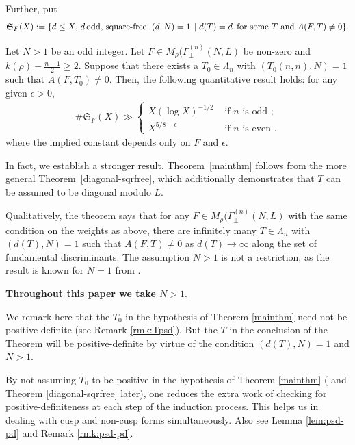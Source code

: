 \documentclass[11pt]{amsart}
\numberwithin{equation}{section}
\newcommand{\mk}{\mathfrak}
\newcommand{\Mrho}[2]{M_\rho(\Gamma_\pm^{(#1)}(#2, L)}
\begin{document}
Further, put
\begin{align} \label{sfx}
{\mk S}_F (X) := \{ d \leq X, \,  d \, \mbox{\rm{odd, square-free}}, \, (d,N)=1 \, \mid  d(T)=d \, \mbox{\rm{ for some }} T \mbox{\rm{ and }}  A(F,T) \neq 0 \}.  
\end{align}




\begin{theorem}\label{mainthm}
Let $N>1$ be an odd integer. Let $F \in \Mrho{n}{N}$ be non-zero and $k(\rho) - \frac{n-1}{2} \ge 2 $. Suppose that there exists a $T_0\in \Lambda_n$ with $(T_0(n,n), N)=1$ such that $A(F,T_0)\neq 0$. Then, the following  quantitative result holds: for any given $\epsilon>0$,
\begin{align*}
\# {\mk S}_F (X)  \gg\begin{cases} X(\log X)^{-1/2} &\text{ if } n \text{ is odd };  \\ 
X^{5/8 - \epsilon} &\text{ if } n \text{ is even }.
\end{cases}
\end{align*}
where the implied constant depends only on $F$ and $\epsilon$.
\end{theorem}

In fact, we establish a stronger result. Theorem~\ref{mainthm} follows from the more general Theorem~\ref{diagonal-sqrfree}, which additionally demonstrates that $T$ can be assumed to be diagonal modulo $L$.

Qualitatively, the theorem says that for any $F \in \Mrho{n}{N}$ with the same condition on the weights as above, there are infinitely many $T\in \Lambda_n$ with $(d(T), N)=1$ such that $A(F,T)\neq 0$ as $d(T) \to \infty$ along the set of fundamental discriminants.
The assumption $N>1$ is not a restriction, as the result is known for $N=1$ from \cite{boche-das}.

{\bf Throughout this paper we take $N>1$}.

We remark here that the $T_0$ in the hypothesis of Theorem \ref{mainthm} need not be positive-definite (see Remark \ref{rmk:Tpsd}). But the $T$ in the conclusion of the Theorem will be positive-definite by virtue of the condition $(d(T), N)=1$ and $N>1$.

\begin{remark}\label{rmk:Tpsd}
By not assuming $T_0$ to be positive in the hypothesis of Theorem \ref{mainthm} ( and Theorem \ref{diagonal-sqrfree} later), one reduces the extra work of checking for positive-definiteness at each step of the induction process. This helps us in dealing with cusp and non-cusp forms simultaneously. Also see Lemma \ref{lem:psd-pd} and Remark \ref{rmk:psd-pd}.
\end{remark}
\end{document}
